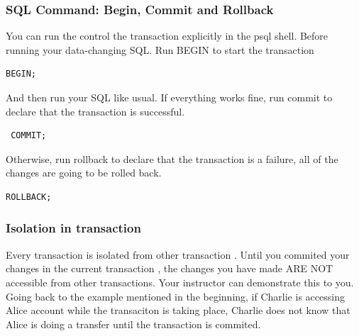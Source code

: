 \documentclass[a4paper]{article}
\begin{document}
\subsubsection{SQL Command: Begin, Commit and Rollback}
You can run the control the transaction explicitly in the psql shell. Before running your data-changing SQL. Run BEGIN to start the transaction
\begin{lstlisting}
BEGIN;
\end{lstlisting}
And then run your SQL like usual. If everything works fine, run commit to declare that the transaction is successful.
\begin{lstlisting}  
 COMMIT;
\end{lstlisting}
Otherwise, run rollback to declare that the transaction is a failure, all of the changes are going to be rolled back.
\begin{lstlisting}
ROLLBACK;
\end{lstlisting}

\subsubsection{Isolation in transaction}
Every transaction is isolated from other transaction . Until you commited your changes in the current transaction , the changes you have made ARE NOT accessible from other transactions. Your instructor can demonstrate this to you.\\

Going back to the example mentioned in the beginning, if Charlie is accessing Alice account while the transaciton is taking place, Charlie does not know that Alice is doing a transfer until the transaction is commited.
\end{document}
